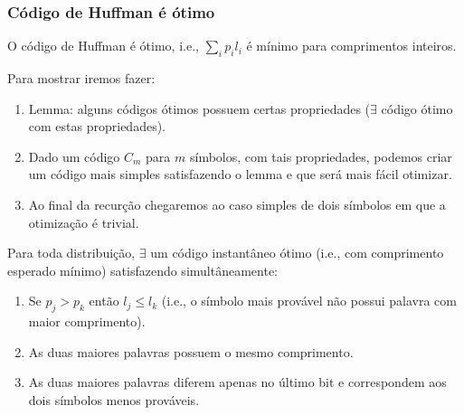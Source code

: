 \begin{frame}[allowframebreaks]
  \frametitle{Código de Huffman é ótimo}
  O código de Huffman é ótimo, i.e., $\sum_i p_i l_i$ é mínimo para comprimentos inteiros.

  Para mostrar iremos fazer:
  \begin{enumerate} 
  \item Lemma: alguns códigos ótimos possuem certas propriedades ($\exists$ código ótimo com estas propriedades).
  \item Dado um código $C_m$ para $m$ símbolos, com tais propriedades, podemos criar um código mais simples satisfazendo o lemma e que será
	mais fácil otimizar.
  \item Ao final da recurção chegaremos ao caso simples de dois símbolos em que a otimização é trivial.
  \end{enumerate}

  \framebreak
  \begin{lemma}
  Para toda distribuição, $\exists$ um código instantâneo ótimo (i.e., com comprimento esperado mínimo)
  satisfazendo simultâneamente:
  \begin{enumerate}
  \item Se $p_j > p_k$ então $l_j \leq l_k$ (i.e., o símbolo mais provável não possui palavra com maior comprimento).
  \item As duas maiores palavras possuem o mesmo comprimento.
  \item As duas maiores palavras diferem apenas no último bit e correspondem aos dois símbolos menos prováveis.
  \end{enumerate}
  \end{lemma}


\end{frame}
